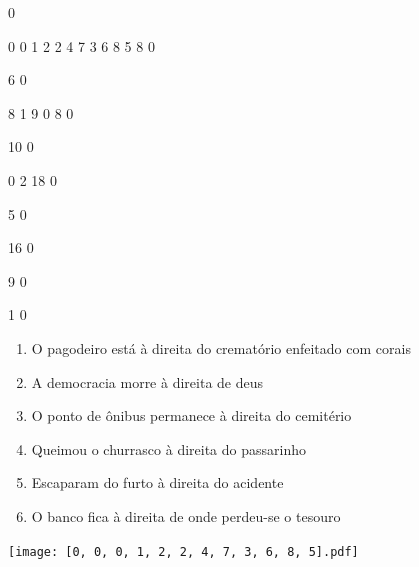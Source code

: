 \documentclass[12pt]{article}
\begin{document}
		\vfill  
		  
{
	0	%

	0	%
	0	%
	1	%
	2	%
	2	%
	4	%
	7	%
	3	%
	6	%
	8	%
	5	%
	8	%
	0	%

	6	%
	0	%

	8	%
	1	%
	9	%
	0	%
	8	%
	0	%

	10	%
	0	%

	0	%
	2	%
	18	%
	0	%

	5	%
	0	%

	16	%
	0	%

	9	%
	0	%

	1	%
	0	%

}	  
		    	

		 

\pagebreak


	\begin{enumerate}
		  \sffamily %
		  \large %


\vfill \item
O pagodeiro está	%
à direita
do crematório enfeitado com corais	%

\vfill \item
A democracia morre	%
à direita
de deus	%

\vfill \item
O ponto de ônibus permanece	%
à direita
do cemitério	%

\vfill \item
Queimou o churrasco	%
à direita
do passarinho	%

\vfill \item
Escaparam do furto	%
à direita
do acidente	%

\vfill \item
O banco fica	%
à direita
de onde perdeu-se o tesouro	%
	\end{enumerate}
		  
		  \hfill

		  \vfill

\texttt{[image: [0, 0, 0, 1, 2, 2, 4, 7, 3, 6, 8, 5].pdf]}


	\hfill	  	  

\end{document}
